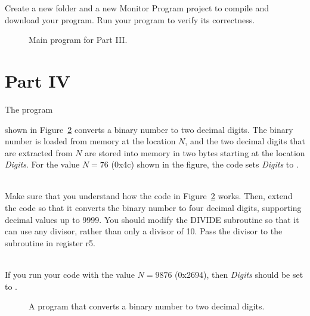 \documentclass[epsfig,10pt,fullpage]{article}
\newcommand{\CommonDocsPath}{../../../../common/docs}
\begin{document}
Create a new folder and a new Monitor Program project to compile and download your program.
Run your program to verify its correctness.

\begin{figure}[H]
\begin{center}

\end{center}
\caption{Main program for Part III.}
\label{fig:main}
\end{figure}


\section*{Part IV}
The program 


shown in Figure~\ref{fig:decimal} converts a binary number to two decimal digits.
The binary number is loaded from memory at the location $N$, and the two
decimal digits that are extracted from $N$ are stored into memory in two bytes starting at 
the location {\it Digits}. For the value $N = 76$ ({\sf0x4c}) shown in the figure, the code sets 
{\it Digits} to {}.

~\\

Make sure that you understand how the code in Figure~\ref{fig:decimal} works. Then, extend
the code so that it converts the binary number to four decimal digits, supporting decimal 
values up to 9999. You should modify the DIVIDE subroutine so that it can use any divisor, 
rather than only a divisor of 10. Pass the divisor to the subroutine in register r5.

~\\

If you run your code with the value $N = 9876$ ({\sf0x2694}), then {\it Digits} should be set to 
{}.

\begin{figure}[H]
\begin{center}

\end{center}
\caption{A program that converts a binary number to two decimal digits.}
\label{fig:decimal}
\end{figure}



\end{document}
